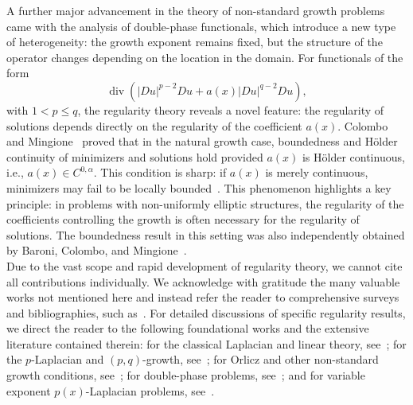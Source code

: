 \documentclass[10pt,reqno]{amsart}
\newcommand *\w{^\wedge}
\theoremstyle{definition}
\numberwithin{equation}{section}
\begin{document}
A further major advancement in the theory of non-standard growth problems came with the analysis of double-phase functionals, which introduce a new type of heterogeneity: the growth exponent remains fixed, but the structure of the operator changes depending on the location in the domain. For functionals of the form
\[
\operatorname{div}\!\left(|D u|^{p-2}D u + a(x)|D u|^{q-2}D u\right),
\]
with $1 < p \leq q$, the regularity theory reveals a novel feature: the regularity of solutions depends directly on the regularity of the coefficient $a(x)$. Colombo and Mingione~\cite{Colombo2015, Colombo2015b} proved that in the natural growth case, boundedness and H\"older continuity of minimizers and solutions hold provided $a(x)$ is H\"older continuous, i.e., $a(x) \in C^{0,\alpha}$. This condition is sharp: if $a(x)$ is merely continuous, minimizers may fail to be locally bounded~\cite{Colombo2015}. This phenomenon highlights a key principle: in problems with non-uniformly elliptic structures, the regularity of the coefficients controlling the growth is often necessary for the regularity of solutions. The boundedness result in this setting was also independently obtained by Baroni, Colombo, and Mingione~\cite{Baroni2016}.\\

Due to the vast scope and rapid development of regularity theory, we cannot cite all contributions individually. We acknowledge with gratitude the many valuable works not mentioned here and instead refer the reader to comprehensive surveys and bibliographies, such as~\cite{mr3, Mingione2006}. For detailed discussions of specific regularity results, we direct the reader to the following foundational works and the extensive literature contained therein: for the classical Laplacian and linear theory, see~\cite{deGiorgi1957, Nash1958, Moser1960, Moser1961}; for the $p$-Laplacian and $(p,q)$-growth, see~\cite{ GmeinederKristensen2024, Uraltseva1968,  KristensenTaheri2003, Li1988, Uhlenbeck1977,  KristensenMingione2008, DeFilippisKochKristensen2024,  KristensenMingione2010, Manfredi1986, Manfredi1988, marc1, marc2, Ac1, Ac2, mg3, MG3, NF, LE, MH, Pucci}; for Orlicz and other non-standard growth conditions, see~\cite{Li1991, Simon1,HsK2,HsK1,HHL21, Harjulehto2017, Cupini2017, Eleuteri2016, Chlebicka2021, Chlebicka2022, mgg}; for double-phase problems, see~\cite{Colombo2015, Colombo2015b, Baroni2016,defi,Simon1}; and for variable exponent $p(x)$-Laplacian problems, see~\cite{Fan1999, FanZhao1999, Acerbi2007, Coscia1999, KKPZ}.\\
\end{document}
